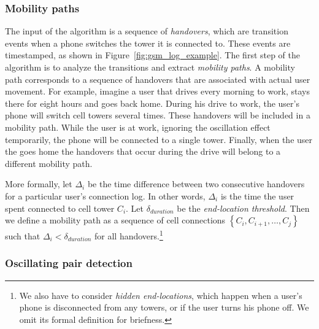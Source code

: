 \documentclass[letterpaper, 12pt, conference]{ieeeconf}
\begin{document}
\subsubsection{Mobility paths}
The input of the algorithm is a sequence of \textit{handovers}, which are 
transition events when a phone switches the tower it is connected to. These 
events are timestamped, as shown in Figure~\ref{fig:gsm_log_example}. The 
first step of the algorithm is to analyze the transitions and extract \textit{
mobility paths}.  A mobility path corresponds to a sequence of handovers that 
are associated with actual user movement. For example, imagine a user that 
drives every morning to work, stays there for eight hours and goes back home. 
During his drive to work, the user's phone will switch cell towers several 
times. These handovers will be included in a mobility path. While the user is 
at work, ignoring the oscillation effect temporarily, the phone will be 
connected to a single tower. Finally, when the user the goes home the 
handovers that occur during the drive will belong to a different mobility path.

More formally, let $\Delta_i$ be the time difference between two consecutive 
handovers for a particular user's connection log. In other words, $\Delta_i$ 
is the time the user spent connected to cell tower $C_i$. Let $\delta_{
duration}$ be the \textit{end-location threshold}. Then we define a mobility 
path as a sequence of cell connections $\left\{C_i, C_{i+1}, \ldots, C_j
\right\}$ such that $\Delta_i < \delta_{duration}$ for all handovers.\footnote
{We also have to consider \textit{hidden end-locations}, which happen when a 
user's phone is disconnected from any towers, or if the user turns his phone 
off. We omit its formal definition for briefness.}


\subsubsection{Oscillating pair detection}
\end{document}

